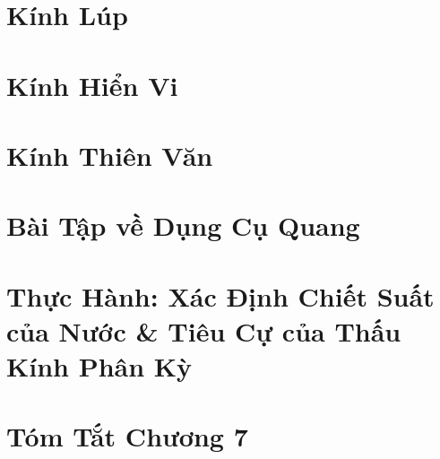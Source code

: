 \documentclass[oneside]{book}
\numberwithin{equation}{section}
\begin{document}

\section{Kính Lúp}


\section{Kính Hiển Vi}


\section{Kính Thiên Văn}


\section{Bài Tập về Dụng Cụ Quang}


\section{Thực Hành: Xác Định Chiết Suất của Nước \& Tiêu Cự của Thấu Kính Phân Kỳ}


\section{Tóm Tắt Chương 7}


\printbibliography[heading=bibintoc]
	
\end{document}
